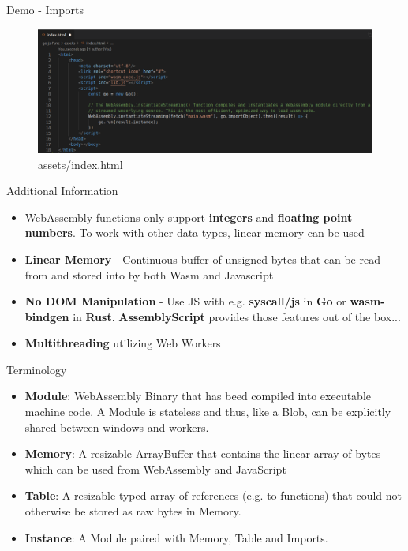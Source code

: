 \documentclass{beamer}
\begin{document}
\begin{frame}{Demo - Imports}
    \begin{figure}
        \includegraphics[scale=0.2]{./images/importindex.png}
        \caption{assets/index.html}
    \end{figure}
\end{frame}

\begin{frame}{Additional Information}
    \begin{itemize}
        \item WebAssembly functions only support \textbf{integers} and \textbf{floating point numbers}. To work with other data types, linear memory can be used
        \item \textbf{Linear Memory} - Continuous buffer of unsigned bytes that can be read from and stored into by both Wasm and Javascript
        \item \textbf{No DOM Manipulation} - Use JS with e.g. \textbf{syscall/js} in \textbf{Go} or \textbf{wasm-bindgen} in \textbf{Rust}. \textbf{AssemblyScript} provides those features out of the box...
        \item \textbf{Multithreading} utilizing Web Workers
    \end{itemize}
\end{frame}

\begin{frame}{Terminology}
    \begin{itemize}
        \item \textbf{Module}: WebAssembly Binary that has beed compiled into executable machine code. A Module is stateless and thus, like a Blob, can be explicitly shared between windows and workers.
        \item \textbf{Memory}: A resizable ArrayBuffer that contains the linear array of bytes which can be used from WebAssembly and JavaScript 
        \item \textbf{Table}: A resizable typed array of references (e.g. to functions) that could not otherwise be stored as raw bytes in Memory. 
        \item \textbf{Instance}:  A Module paired with Memory, Table and Imports.
    \end{itemize}
\end{frame}
\end{document}
